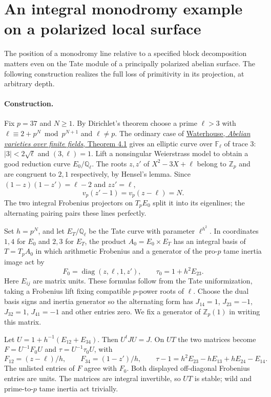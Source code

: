 \documentclass[11pt]{article}
\begin{document}
\section{An integral monodromy example on a polarized local surface}
\label{sec:local-polarized-surface}
The position of a monodromy line relative to a specified block
decomposition matters even on the Tate module of a principally
polarized abelian surface. The following construction realizes the
full loss of primitivity in its projection, at arbitrary depth.

\paragraph{Construction.}
Fix $p=37$ and $N\ge1$. By Dirichlet's theorem choose a prime
$\ell>3$ with $\ell\equiv2+p^N\bmod p^{N+1}$ and $\ell\ne p$.
The ordinary case of
\href{https://www.numdam.org/articles/10.24033/asens.1183/}{Waterhouse,
\emph{Abelian varieties over finite fields}, Theorem 4.1}
gives an elliptic curve over $\mathbb F_\ell$ of trace $3$:
$|3|<2\sqrt\ell$ and $(3,\ell)=1$. Lift a nonsingular Weierstrass
model to obtain a good reduction curve $E_0/\mathbb Q_\ell$.
The roots $z,z'$ of $X^2-3X+\ell$ belong to $\mathbb Z_p$ and
are congruent to $2,1$ respectively, by Hensel's lemma. Since
$(1-z)(1-z')=\ell-2$ and $zz'=\ell$,
\[
 v_p(z'-1)=v_p(z-\ell)=N.
\]
The two integral Frobenius projectors on $T_p E_0$ split it into
its eigenlines; the alternating pairing pairs these lines perfectly.

Set $h=p^N$, and let $E_T/\mathbb Q_\ell$ be the Tate curve with
parameter $\ell^{h^2}$. In coordinates $1,4$ for $E_0$ and
$2,3$ for $E_T$, the product $A_0=E_0\times E_T$ has an integral
basis of $T=T_pA_0$ in which arithmetic Frobenius and a generator
of the pro-$p$ tame inertia image act by
\[
 F_0=\operatorname{diag}(z,\ell,1,z'),\qquad \tau_0=1+h^2E_{23}.
\]
Here $E_{ij}$ are matrix units. These formulas follow from the
Tate uniformization, taking a Frobenius lift fixing compatible
$p$-power roots of $\ell$. Choose the dual basis signs and inertia
generator so the alternating form has
$J_{14}=1$, $J_{23}=-1$, $J_{32}=1$, $J_{41}=-1$ and other
entries zero. We fix a generator of $\mathbb Z_p(1)$ in writing
this matrix.

Let $U=1+h^{-1}(E_{12}+E_{34})$. Then $U^tJU=J$.
On $UT$ the two matrices become $F=U^{-1}F_0U$ and
$\tau=U^{-1}\tau_0U$, with
\[
 F_{12}=(z-\ell)/h,\qquad F_{34}=(1-z')/h,\qquad
 \tau-1=h^2E_{23}-hE_{13}+hE_{24}-E_{14}.
\]
The unlisted entries of $F$ agree with $F_0$.
Both displayed off-diagonal Frobenius entries are units. The matrices
are integral invertible, so $UT$ is stable; wild and prime-to-$p$
tame inertia act trivially.
\end{document}
